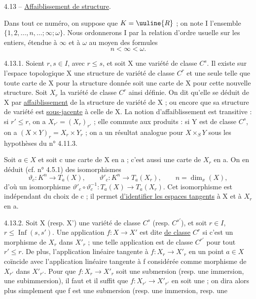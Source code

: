 
4.13 -- \uline{Affaiblissement de structure}.

Dans tout ce numéro, on suppose que $K=\uuline{R}$ ; on note I l'ensemble $\{1,2,\ldots,n,\ldots;\infty;\omega\}$. Nous ordonnerons I par la relation d'ordre usuelle sur les entiers, étendue à $\infty$ et à $\omega$ au moyen des formules
\[
n<\infty<\omega.
\]

4.13.1. Soient $r,s\in I$, avec $r\leq s$, et soit X une variété de classe $C^s$. Il existe sur l'espace topologique X une structure de variété de classe $C^r$ et une seule telle que toute carte de X pour la structure donnée soit une carte de X pour cette nouvelle structure. Soit $X_r$ la variété de classe $C^r$ ainsi définie. On dit qu'elle se déduit de X par \uline{affaiblissement} de la structure de variété de X ; ou encore que sa structure de variété est \uline{sous-jacente} à celle de X. La notion d'affaiblissement est transitive : si $r'\leq r$, on a $X_{r'}=(X_r)_{r'}$ ; elle commute aux produits : si Y est de classe $C^s$, on a $(X\times Y)_r=X_r\times Y_r$ ; on a un résultat analogue pour $X\times_S Y$ sous les hypothèses du n° 4.11.3.

Soit $a\in X$ et soit c une carte de X en a ; c'est aussi une carte de $X_r$ en a. On en déduit (cf. n° 4.5.1) des isomorphismes
\[
\vartheta_c:K^n\longrightarrow T_a(X),\qquad
\vartheta'_c:K^n\longrightarrow T_a(X_r),\qquad n=\dim_x(X),
\]
d'où un isomorphisme $\vartheta'_c\circ\vartheta_c^{-1}:T_a(X)\longrightarrow T_a(X_r)$. Cet isomorphisme est indépendant du choix de c ; il permet \uline{d'identifier les espaces tangents} à X et à $X_r$ en a.

4.13.2. Soit X (resp. X') une variété de classe $C^s$ (resp. $C^{s'}$), et soit $r\in I$, $r\leq\operatorname{Inf}(s,s')$. Une application $f:X\longrightarrow X'$ est dite \uline{de classe} $C^r$ si c'est un morphisme de $X_r$ dans $X'_r$ ; une telle application est de classe $C^{r'}$ pour tout $r'\leq r$. De plus, l'application linéaire tangente à $f:X_r\longrightarrow X'_r$ en un point $a\in X$ coïncide avec l'application linéaire tangente à f considérée comme morphisme de $X_{r'}$ dans $X'_{r'}$. Pour que $f:X_r\longrightarrow X'_r$ soit une submersion (resp. une immersion, une subimmersion), il faut et il suffit que $f:X_{r'}\longrightarrow X'_{r'}$ en soit une ; on dira alors plus simplement que f est une submersion (resp. une immersion, resp. une
